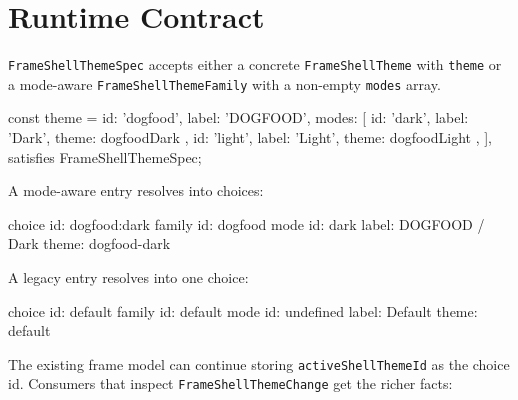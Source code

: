 \section{Runtime Contract}\label{record-181-runtime-contract}

\texttt{F\allowbreak{}r\allowbreak{}a\allowbreak{}m\allowbreak{}e\allowbreak{}S\allowbreak{}h\allowbreak{}e\allowbreak{}l\allowbreak{}l\allowbreak{}T\allowbreak{}h\allowbreak{}e\allowbreak{}m\allowbreak{}e\allowbreak{}S\allowbreak{}p\allowbreak{}e\allowbreak{}c} accepts either a concrete \texttt{F\allowbreak{}r\allowbreak{}a\allowbreak{}m\allowbreak{}e\allowbreak{}S\allowbreak{}h\allowbreak{}e\allowbreak{}l\allowbreak{}l\allowbreak{}T\allowbreak{}h\allowbreak{}e\allowbreak{}m\allowbreak{}e} with \texttt{t\allowbreak{}h\allowbreak{}e\allowbreak{}m\allowbreak{}e} or a mode-aware \texttt{F\allowbreak{}r\allowbreak{}a\allowbreak{}m\allowbreak{}e\allowbreak{}S\allowbreak{}h\allowbreak{}e\allowbreak{}l\allowbreak{}l\allowbreak{}T\allowbreak{}h\allowbreak{}e\allowbreak{}m\allowbreak{}e\allowbreak{}F\allowbreak{}a\allowbreak{}m\allowbreak{}i\allowbreak{}l\allowbreak{}y} with a non-empty \texttt{m\allowbreak{}o\allowbreak{}d\allowbreak{}e\allowbreak{}s} array.

\begin{CodeBlock}
const theme = {
  id: 'dogfood',
  label: 'DOGFOOD',
  modes: [
    { id: 'dark', label: 'Dark', theme: dogfoodDark },
    { id: 'light', label: 'Light', theme: dogfoodLight },
  ],
} satisfies FrameShellThemeSpec;
\end{CodeBlock}

A mode-aware entry resolves into choices:

\begin{CodeBlock}
choice id: dogfood:dark
family id: dogfood
mode id: dark
label: DOGFOOD / Dark
theme: dogfood-dark
\end{CodeBlock}

A legacy entry resolves into one choice:

\begin{CodeBlock}
choice id: default
family id: default
mode id: undefined
label: Default
theme: default
\end{CodeBlock}

The existing frame model can continue storing \texttt{a\allowbreak{}c\allowbreak{}t\allowbreak{}i\allowbreak{}v\allowbreak{}e\allowbreak{}S\allowbreak{}h\allowbreak{}e\allowbreak{}l\allowbreak{}l\allowbreak{}T\allowbreak{}h\allowbreak{}e\allowbreak{}m\allowbreak{}e\allowbreak{}I\allowbreak{}d} as the choice id. Consumers that inspect \texttt{F\allowbreak{}r\allowbreak{}a\allowbreak{}m\allowbreak{}e\allowbreak{}S\allowbreak{}h\allowbreak{}e\allowbreak{}l\allowbreak{}l\allowbreak{}T\allowbreak{}h\allowbreak{}e\allowbreak{}m\allowbreak{}e\allowbreak{}C\allowbreak{}h\allowbreak{}a\allowbreak{}n\allowbreak{}g\allowbreak{}e} get the richer facts:

